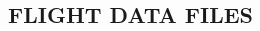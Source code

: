 \documentclass[Space_Shuttle_Ultra_Manual.tex]{subfiles}
\begin{document}
\begin{multicols}{2}
\section{FLIGHT DATA FILES}

\end{multicols}
\end{document}
